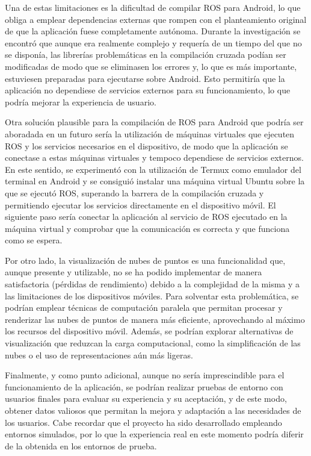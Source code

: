 Una de estas limitaciones es la dificultad de compilar ROS para Android, lo que obliga 
a emplear dependencias externas que rompen con el planteamiento original de que la aplicación fuese 
completamente autónoma.
Durante la investigación se encontró que aunque era realmente complejo y requería de un tiempo del que 
no se disponía, las librerías problemáticas en la compilación cruzada podían ser modificadas de modo que 
se eliminasen los errores y, lo que es más importante, estuviesen preparadas para ejecutarse 
sobre Android. Esto permitiría que la aplicación no dependiese de servicios 
externos para su funcionamiento, lo que podría mejorar la experiencia de usuario.

Otra solución plausible para la compilación de ROS para Android 
que podría ser aboradada en un futuro sería la utilización de máquinas virtuales que ejecuten ROS y 
los servicios necesarios en el dispositivo, 
de modo que la aplicación se conectase a estas máquinas virtuales y tempoco dependiese de servicios externos.
En este sentido, se experimentó con la utilización de Termux como emulador del terminal en Android 
y se consiguió instalar una máquina virtual Ubuntu sobre la que se ejecutó ROS, superando la barrera
de la compilación cruzada y permitiendo ejecutar los servicios directamente en el dispositivo móvil. 
El siguiente paso sería conectar la aplicación al servicio de ROS ejecutado en la máquina virtual y 
comprobar que la comunicación es correcta y que funciona como se espera.

Por otro lado, la visualización de nubes de puntos es una funcionalidad que, aunque presente y utilizable,
no se ha podido implementar 
de manera satisfactoria (pérdidas de rendimiento) debido a la complejidad de la misma y a las limitaciones de los dispositivos móviles.
Para solventar esta problemática, se podrían emplear técnicas de computación paralela que permitan procesar y 
renderizar las nubes de puntos de manera más eficiente, aprovechando al máximo los recursos del dispositivo móvil. 
Además, se podrían explorar alternativas de visualización que reduzcan la carga computacional, como la simplificación 
de las nubes o el uso de representaciones aún más ligeras.

Finalmente, y como punto adicional, aunque no sería imprescindible para el funcionamiento de la aplicación, 
se podrían realizar pruebas de entorno con usuarios finales para evaluar su experiencia y su aceptación,
y de este modo, obtener datos valiosos que permitan la mejora y 
adaptación a las necesidades de los usuarios. Cabe recordar que el proyecto ha sido desarrollado empleando entornos 
simulados, por lo que la experiencia real en este momento podría diferir de la obtenida en los entornos de prueba.